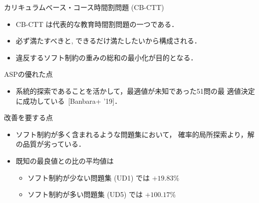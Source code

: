 \documentclass[11pt,dvipdfmx]{beamer}
\begin{document}
\begin{frame}{カリキュラムベース・コース時間割問題 (CB-CTT)}
  \begin{itemize}
  \item CB-CTT は代表的な教育時間割問題の一つである．
  \item 必ず満たすべきと, 
    できるだけ満たしたいから構成される．
  \item 違反するソフト制約の重みの総和の最小化が目的となる．
  \end{itemize}

  \begin{alertblock}{ASPの優れた点}
    \begin{itemize}
    \item 系統的探索であることを活かして，最適値が未知であった51問の最
      適値決定に成功している~[Banbara+ '19]．
  \end{itemize}    
  \end{alertblock}

  \begin{block}{改善を要する点}
    \begin{itemize}
    \item ソフト制約が多く含まれるような問題集において，
      確率的局所探索より，解の品質が劣っている．
     \item 既知の最良値との比の平均値は
       \begin{itemize}
       \item ソフト制約が少ない問題集 (UD1) では $+19.83\%$
       \item ソフト制約が多い問題集 (UD5) では $+100.17\%$
       \end{itemize}
    \end{itemize}
  \end{block}
\end{frame}
\end{document}
